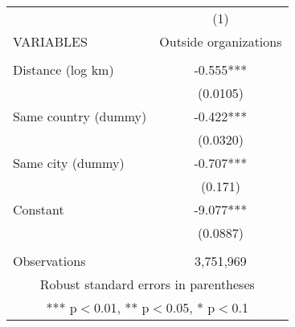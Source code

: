 \begin{tabular}{lc} \hline
 & (1) \\
VARIABLES & Outside organizations \\ \hline
 &  \\
Distance (log km) & -0.555*** \\
 & (0.0105) \\
Same country (dummy) & -0.422*** \\
 & (0.0320) \\
Same city (dummy) & -0.707*** \\
 & (0.171) \\
Constant & -9.077*** \\
 & (0.0887) \\
 &  \\
 Observations & 3,751,969 \\ \hline
\multicolumn{2}{c}{ Robust standard errors in parentheses} \\
\multicolumn{2}{c}{ *** p$<$0.01, ** p$<$0.05, * p$<$0.1} \\
\end{tabular}
